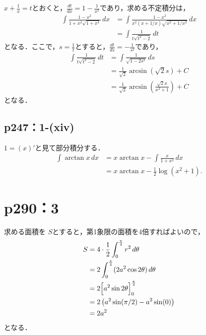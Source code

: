 \documentclass[a4paper,10pt,fleqn]{ltjsarticle}
\begin{document}
\begin{tleftbar}
    $x+\frac{1}{x}=t$とおくと，$\frac{dt}{dx}=1-\frac{1}{x^2}$であり，求める不定積分は，
    \begin{align*}
        \int \frac{1-x^2}{1+x^2\sqrt{1+x^4}} \, dx & = \int \frac{1-x^2}{x^2 (x+1/x)\sqrt{x^2 + 1/x^2}} \, dx \\
                                                   & =\int \frac{1}{t\sqrt{t^2-2}} \, dt
    \end{align*}
    となる．ここで，$s=\frac{1}{t}$とすると，$\frac{dt}{ds}=-\frac{1}{s^2}$であり，
    \begin{align*}
        \int \frac{1}{t \sqrt{t^2-2}} \, dt & = \int \frac{1}{\sqrt{1-2s^2}} \, ds                                 \\
                                            & = \frac{1}{\sqrt{2}} \arcsin (\sqrt{2}s)+C                           \\
                                            & = \frac{1}{\sqrt{2}} \arcsin \left(\frac{\sqrt{2}x}{x^2+1} \right)+C
    \end{align*}
    となる．
\end{tleftbar}

\subsection*{p247：1-(xiv)}


\begin{leftbar}
    $1 = (x)'$と見て部分積分する．
    \begin{align*}
        \int \arctan x \,dx
         & = x \arctan x - \int \frac{x}{1+x^2} \,dx \\
         & = x \arctan x - \frac{1}{2} \log (x^2+1).
    \end{align*}
\end{leftbar}

\newpage


\section*{p290：3}

\begin{leftbar}
    求める面積を $S$とすると，第1象限の面積を$4$倍すればよいので，
    \begin{align*}
        S & =4 \cdot  \frac{1}{2}\int_{0}^{\frac{\pi}{4}} r^2 \, d \theta \\
          & = 2 \int_{0}^{\frac{\pi}{4}} (2a^2 \cos 2\theta) \, d \theta  \\
          & =2\Bigl [ a^2 \sin 2\theta \Bigl ]_{0}^{\frac{\pi}{4}}        \\
          & = 2\left ( a^2 \sin (\pi/2)-a^2 \sin (0) \right)              \\
          & = 2a^2
    \end{align*}
    となる．
\end{leftbar}
\end{document}
